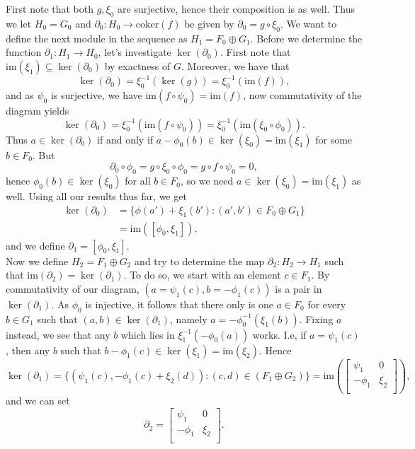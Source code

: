 \documentclass{article}
\theoremstyle{definition}
\newcommand{\im}{\text{im}}
\newcommand{\coker}{\text{coker}}
\begin{document}
First note that both $g, \xi_0$ are surjective, hence their composition is as
well. Thus we let $H_0 = G_0$ and $\partial_0 : H_0 \to \coker(f)$ be given by
$\partial_0 = g \circ \xi_0$. We want to define the next module in the sequence
as $H_1 = F_0 \oplus G_1$. Before we determine the function $\partial_1 : H_1
\to H_0$, let's investigate $\ker(\partial_0)$. First note that $\im(\xi_1)
\subseteq \ker(\partial_0)$ by exactness of $G$. Moreover, we have that
\[
	\ker(\partial_0)
	=
	\xi_0^{-1}(\ker(g))
	=
	\xi_0^{-1}(\im(f)),
\] 
and as $\psi_0$ is surjective, we have $\im(f \circ \psi_0) = \im(f)$,
now commutativity of the diagram yields
\[
	\ker(\partial_0)
	=
	\xi_0^{-1}(\im(f \circ \psi_0))
	=
	\xi_0^{-1}(\im(\xi_0 \circ \phi_0)).
\]
Thus $a \in \ker(\partial_0)$ if and only if $a - \phi_0(b) \in \ker(\xi_0) =
\im(\xi_1)$ for some $b \in F_0$. But
\[
	\partial_0 \circ \phi_0
	=
	g \circ \xi_0 \circ \phi_0
	=
	g \circ f \circ \psi_0
	=
	0,
\]
hence $\phi_0(b) \in \ker(\xi_0)$ for all $b \in F_0$, so we need $a \in
\ker(\xi_0) = \im(\xi_1)$ as well. Using all our results thus far, we get
\begin{align*}
	\ker(\partial_0)
	&= 
	\{ \phi(a') + \xi_1(b') : (a', b') \in F_0 \oplus G_1 \} \\
	&= 
	\im([\phi_0, \xi_1]),
\end{align*}
and we define $\partial_1 = [\phi_0, \xi_1]$. \\

Now we define $H_2 = F_1 \oplus G_2$ and try to determine the map $\partial_2 :
H_2 \to H_1$ such that $\im(\partial_2) = \ker(\partial_1)$. To do so, we start
with an element $c \in F_1$. By commutativity of our diagram, $(a = \psi_1(c),
b = -\phi_1(c))$ is a pair in $\ker(\partial_1)$. As $\phi_0$ is injective, it
follows that there only is one $a \in F_0$ for every $b \in G_1$ such that $(a,
b) \in \ker(\partial_1)$, namely $a = -\phi_0^{-1}(\xi_1(b))$. Fixing $a$
instead, we see that any $b$ which lies in $\xi_1^{-1}(-\phi_0(a))$ works. I.e,
if $a = \psi_1(c)$, then any $b$ such that $b - \phi_1(c) \in \ker(\xi_1) =
\im(\xi_2)$. Hence
\[
	\ker(\partial_1) 
	=
	\{ (\psi_1(c), -\phi_1(c) + \xi_2(d)) : (c, d) \in (F_1 \oplus G_2) \} 
	=
	\im\left(
		\begin{bmatrix}
			\psi_1 & 0 \\	
			-\phi_1 & \xi_2 \\	
		\end{bmatrix}
	\right),
\]
and we can set
\[
	\partial_2
	=
	\begin{bmatrix}
		\psi_1 & 0 \\	
		-\phi_1 & \xi_2 \\	
	\end{bmatrix}.
\] 
\end{document}
